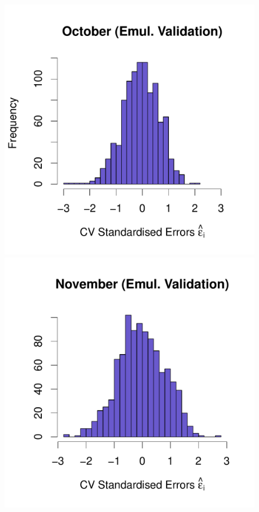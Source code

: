 \documentclass[a4paper, 12pt]{article}
\begin{document}
\begin{figure}
 \includegraphics[width=\scale]{Emulator_CV/Histograms/October_CV_Errors_Hist}\hspace{-3ex}
 \includegraphics[width=\scale]{Emulator_CV/Histograms/November_CV_Errors_Hist}\hspace{-3ex}

\end{figure}
\end{document}
